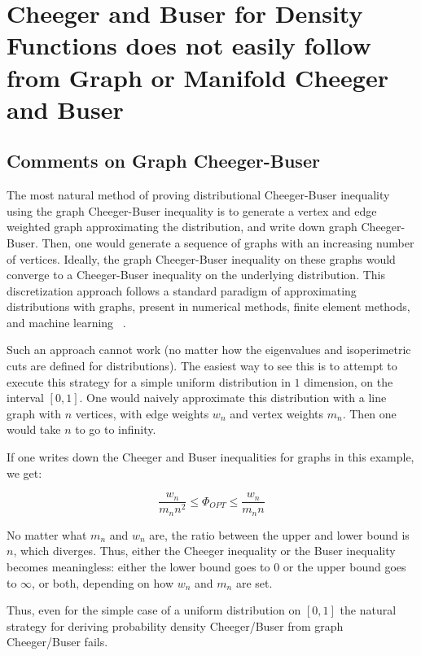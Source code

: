 \section{Cheeger and Buser for Density Functions does not easily follow
  from Graph or Manifold Cheeger and Buser}\label{app:notgraph}

\subsection{Comments on Graph Cheeger-Buser}
The most natural method of proving distributional Cheeger-Buser
inequality using the graph Cheeger-Buser inequality is to
generate a vertex and edge weighted graph approximating the distribution, and write down
graph Cheeger-Buser. Then, one would generate a sequence of graphs with
an increasing number of vertices. Ideally, the graph Cheeger-Buser inequality
on these graphs would converge to a
Cheeger-Buser inequality on the underlying distribution. This
discretization approach follows a standard paradigm of
approximating distributions with graphs, present in
numerical methods, finite element methods,
         and machine learning
         ~\cite{TrillosRate15,TrillosVariational15,SPIELMAN2007284}.

Such an approach cannot work (no matter how the
    eigenvalues and isoperimetric cuts are defined for
    distributions). The easiest way to see this is to attempt to execute
    this strategy for a simple uniform distribution in $1$ dimension, on
    the interval $[0,1]$. One would naively approximate this
    distribution
    with a line graph with $n$ vertices, with edge weights $w_n$ and vertex
    weights $m_n$. Then one would take $n$ to go to infinity.

    If one writes down the Cheeger and Buser inequalities for graphs in
    this example, we get:
    
    \[\frac{w_n}{m_n n^2} \leq \Phi_{OPT} \leq \frac{w_n}{m_n n} \]

    No matter what $m_n$ and $w_n$ are, the ratio between the upper and
    lower bound is $n$, which diverges. Thus, either the Cheeger
    inequality or the Buser inequality becomes meaningless: either the
    lower bound goes to $0$ or the upper bound goes to $\infty$, or
    both, depending on
    how $w_n$ and $m_n$ are set.

    Thus, even for the simple case of a uniform distribution on $[0,1]$
    the natural strategy for deriving probability density Cheeger/Buser
    from graph Cheeger/Buser fails.

